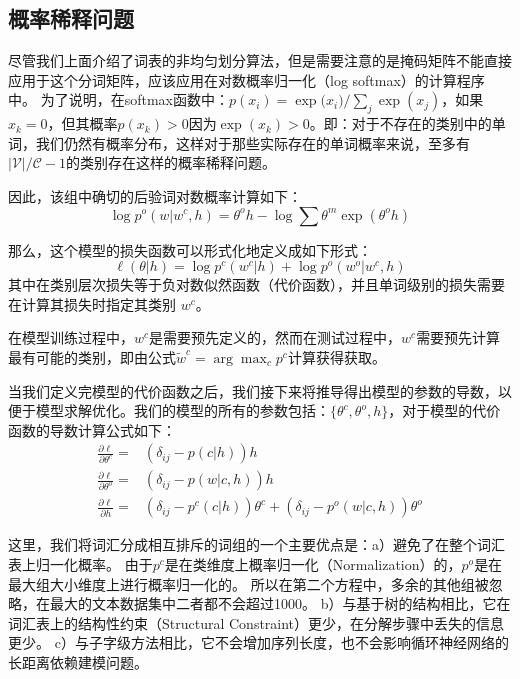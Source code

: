 \subsection{概率稀释问题}
尽管我们上面介绍了词表的非均匀划分算法，但是需要注意的是掩码矩阵不能直接应用于这个分词矩阵，应该应用在对数概率归一化（log softmax）的计算程序中。 为了说明，在softmax函数中：$ p(x_i)= {\exp({x_i}})/ {\sum_j \exp(x_j)} $，如果$ x_k = 0 $，但其概率$ p(x_k)> 0$因为$\exp(x_k)> 0 $。即：对于不存在的类别中的单词，我们仍然有概率分布，这样对于那些实际存在的单词概率来说，至多有$\mathcal{|V|/\mathcal{C}}-1$的类别存在这样的概率稀释问题。

 因此，该组中确切的后验词对数概率计算如下：
\begin{equation}
  \log p^o(w|w^c,h)=\theta^o h -\log\sum\theta^m\exp(\theta^o h)
\end{equation}

那么，这个模型的损失函数可以形式化地定义成如下形式：
\begin{equation}
\ell(\theta|h) =\log p^c(w^c|h) +\log p^o(w^o|w^c,h)
\end{equation}
其中在类别层次损失等于负对数似然函数（代价函数），并且单词级别的损失需要在计算其损失时指定其类别 $ w ^ c $。

在模型训练过程中，$ w ^ c $是需要预先定义的，然而在测试过程中，$w^c$需要预先计算最有可能的类别，即由公式$\tilde w^c=\arg\max_c p^c$计算获得获取。

当我们定义完模型的代价函数之后，我们接下来将推导得出模型的参数的导数，以便于模型求解优化。我们的模型的所有的参数包括：$\{\theta^c,\theta^o,h\}$，对于模型的代价函数的导数计算公式如下：
\begin{equation}
\begin{split}
\frac{\partial \ell}{\partial \theta^c}=& (\delta_{ij}-p(c|h))h \\
\frac{\partial \ell}{\partial \theta^o}=&(\delta_{ij}-p(w|c,h))h \\
\frac{\partial \ell}{\partial h}=&(\delta_{ij}-p^c(c|h))\theta^c + (\delta_{ij}-p^o(w|c,h))\theta^o
\end{split}
\end{equation}

这里，我们将词汇分成相互排斥的词组的一个主要优点是：a）避免了在整个词汇表上归一化概率。 由于$p^c$是在类维度上概率归一化（Normalization）的，$p^o$是在最大组大小维度上进行概率归一化的。 所以在第二个方程中，多余的其他组被忽略，在最大的文本数据集中二者都不会超过1000。 b）与基于树的结构相比，它在词汇表上的结构性约束（Structural Constraint）更少，在分解步骤中丢失的信息更少。 c）与子字级方法相比，它不会增加序列长度，也不会影响循环神经网络的长距离依赖建模问题。



